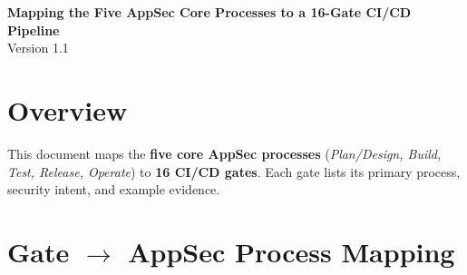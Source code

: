 \documentclass[11pt]{article}
\begin{document}
\begin{center}
  {\LARGE \textbf{Mapping the Five AppSec Core Processes to a 16-Gate CI/CD Pipeline}}\\[4pt]
  {\small Version 1.1}
\end{center}

\section*{Overview}
This document maps the \textbf{five core AppSec processes} (\textit{Plan/Design, Build, Test, Release, Operate}) to \textbf{16 CI/CD gates}. Each gate lists its primary process, security intent, and example evidence.

\section{Gate \texorpdfstring{$\rightarrow$}{→} AppSec Process Mapping}
\small
\setlength{\LTpre}{6pt}
\setlength{\LTpost}{6pt}
\end{document}
